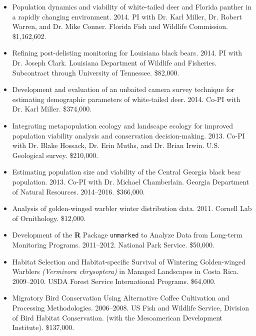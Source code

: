\begin{itemize}
\item Population dynamics and viability of white-tailed deer and
  Florida panther in a rapidly changing environment. 2014. PI with Dr. Karl
  Miller, Dr. Robert Warren, and Dr. Mike Conner. Florida
  Fish and Wildlife Commission. \$1,162,602. 

\item Refining post-delisting monitoring for Louisiana black
  bears. 2014. PI with Dr. Joseph Clark. Louisiana Department of Wildlife and
  Fisheries. Subcontract through University of Tennessee. \$82,000. 

\item Development and evaluation of an unbaited camera survey
  technique for estimating demographic parameters of white-tailed
  deer. 2014. Co-PI with Dr. Karl Miller. \$374,000.  

\item Integrating metapopulation ecology and landscape ecology for
  improved population viability analysis and conservation
  decision-making. 2013. Co-PI with Dr. Blake Hossack, Dr. Erin Muths, and
  Dr. Brian Irwin. U.S. Geological survey. \$210,000.

\item Estimating population size and viability of the Central Georgia
  black bear population. 2013. Co-PI with Dr. Michael
  Chamberlain. Georgia Department of Natural
  Resources. 2014--2016. \$366,000. 

\item Analysis of golden-winged warbler winter distribution
  data. 2011. Cornell Lab of Ornithology. \$12,000. 

\item Development of the {\bf R} Package {\tt unmarked} to Analyze
  Data from Long-term Monitoring Programs. 2011--2012. National Park
  Service. \$50,000. 

\item Habitat Selection and Habitat-specific Survival of Wintering
  Golden-winged Warblers {\it (Vermivora chrysoptera)} in Managed Landscapes
  in Costa Rica. 2009--2010. USDA Forest Service International
  Programs. \$64,000. 

\item Migratory Bird Conservation Using Alternative Coffee
  Cultivation and Processing Methodologies. 2006--2008.  US Fish and
  Wildlife Service, Division of Bird Habitat Conservation. (with
  the Mesoamerican Development Institute). \$137,000.

\end{itemize}


